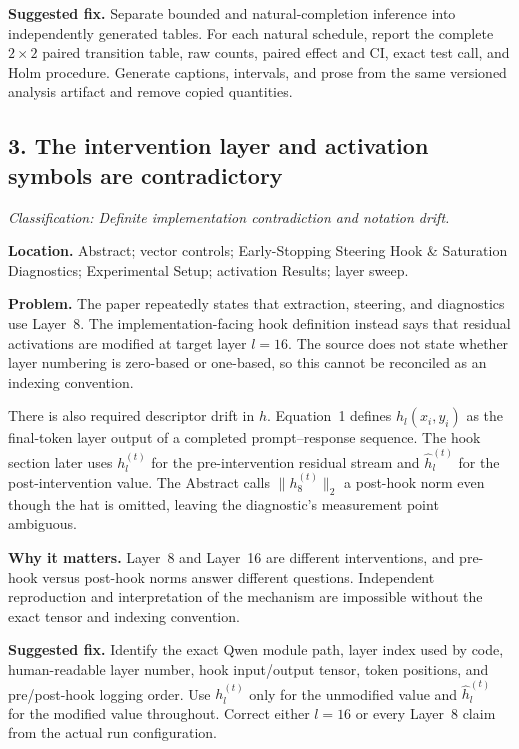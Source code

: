 \documentclass[11pt]{article}
\newcommand{\findinglabel}[1]{\textbf{#1}}
\newcommand{\classification}[1]{\textit{Classification: #1.}}
\begin{document}
\findinglabel{Suggested fix.} Separate bounded and natural-completion inference into independently generated tables.  For each natural schedule, report the complete $2\times2$ paired transition table, raw counts, paired effect and CI, exact test call, and Holm procedure.  Generate captions, intervals, and prose from the same versioned analysis artifact and remove copied quantities.

\subsection*{3. The intervention layer and activation symbols are contradictory}

\classification{Definite implementation contradiction and notation drift}

\findinglabel{Location.} Abstract; vector controls; Early-Stopping Steering Hook \& Saturation Diagnostics; Experimental Setup; activation Results; layer sweep.

\findinglabel{Problem.} The paper repeatedly states that extraction, steering, and diagnostics use Layer~8.  The implementation-facing hook definition instead says that residual activations are modified at target layer $l=16$.  The source does not state whether layer numbering is zero-based or one-based, so this cannot be reconciled as an indexing convention.

There is also required descriptor drift in $h$.  Equation~1 defines $h_l(x_i,y_i)$ as the final-token layer output of a completed prompt--response sequence.  The hook section later uses $h_l^{(t)}$ for the pre-intervention residual stream and $\hat h_l^{(t)}$ for the post-intervention value.  The Abstract calls $\|h_8^{(t)}\|_2$ a post-hook norm even though the hat is omitted, leaving the diagnostic's measurement point ambiguous.

\findinglabel{Why it matters.} Layer~8 and Layer~16 are different interventions, and pre-hook versus post-hook norms answer different questions.  Independent reproduction and interpretation of the mechanism are impossible without the exact tensor and indexing convention.

\findinglabel{Suggested fix.} Identify the exact Qwen module path, layer index used by code, human-readable layer number, hook input/output tensor, token positions, and pre/post-hook logging order.  Use $h_l^{(t)}$ only for the unmodified value and $\hat h_l^{(t)}$ for the modified value throughout.  Correct either $l=16$ or every Layer~8 claim from the actual run configuration.
\end{document}

